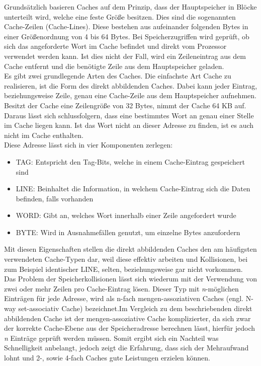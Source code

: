 Grundsätzlich basieren Caches auf dem Prinzip, dass der Hauptspeicher in Blöcke unterteilt wird, welche eine feste Größe besitzen. Dies sind die sogenannten Cache-Zeilen (Cache-Lines).
Diese bestehen aus aufeinander folgenden Bytes in einer Größenordnung von 4 bis 64 Bytes. Bei Speicherzugriffen wird geprüft, ob sich das angeforderte Wort im Cache befindet und direkt
vom Prozessor verwendet werden kann. Ist dies nicht der Fall, wird ein Zeileneintrag aus dem Cache entfernt und die benötigte Zeile aus dem Hauptspeicher geladen. \\
Es gibt zwei grundlegende Arten des Caches. Die einfachste Art Cache zu realisieren, ist die Form des direkt abbildenden Caches. Dabei kann jeder Eintrag, beziehungsweise Zeile, genau
eine Cache-Zeile aus dem Hauptspeicher aufnehmen. Besitzt der Cache eine Zeilengröße von 32 Bytes, nimmt der Cache 64 KB auf. Daraus lässt sich schlussfolgern, dass eine bestimmtes
Wort an genau einer Stelle im Cache liegen kann. Ist das Wort nicht an dieser Adresse zu finden, ist es auch nicht im Cache enthalten. \\

Diese Adresse lässt sich in vier Komponenten zerlegen:
\begin{itemize}
  \item TAG\@: Entspricht den Tag-Bits, welche in einem Cache-Eintrag gespeichert sind
  \item LINE\@: Beinhaltet die Information, in welchem Cache-Eintrag sich die Daten befinden, falls vorhanden
  \item WORD\@: Gibt an, welches Wort innerhalb einer Zeile angefordert wurde
  \item BYTE\@: Wird in Ausnahmefällen genutzt, um einzelne Bytes anzufordern
\end{itemize}





Mit diesen Eigenschaften stellen die direkt abbildenden Caches den am häufigsten verwendeten Cache-Typen dar, weil diese effektiv arbeiten und Kollisionen, bei zum Beispiel identischer LINE,
selten, beziehungsweise gar nicht vorkommen. \\
Das Problem der Speicherkollisionen lässt sich wiederum mit der Verwendung von zwei oder mehr Zeilen pro Cache-Eintrag lösen. Dieser Typ mit \emph{n}-möglichen Einträgen für jede Adresse,
 wird als n-fach mengen-assoziativen Caches (engl. N-way set-associativ Cache) bezeichnet.Im Vergleich zu dem beschriebenden direkt abbildenden Cache ist der mengen-assoziative Cache
 komplizierter, da sich zwar der korrekte Cache-Ebene aus der Speicheradresse berechnen lässt, hierfür jedoch \emph{n} Einträge geprüft werden müssen. Somit ergibt sich ein Nachteil
 was Schnelligkeit anbelangt, jedoch zeigt die Erfahrung, dass sich der Mehraufwand lohnt und 2-, sowie 4-fach Caches gute Leistungen erzielen können.~\cite{cache} \\


